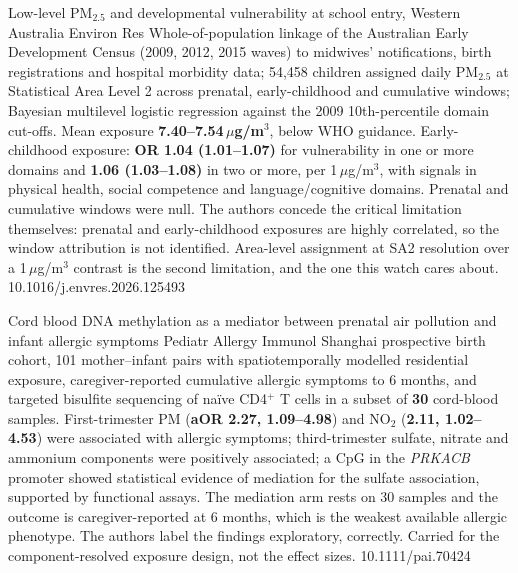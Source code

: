 \documentclass[10pt]{article}
\begin{document}
{Low-level PM$_{2.5}$ and developmental vulnerability at school entry, Western Australia}
{Environ Res}
{Whole-of-population linkage of the Australian Early Development Census (2009, 2012, 2015
waves) to midwives' notifications, birth registrations and hospital morbidity data;
54{,}458 children assigned daily PM$_{2.5}$ at Statistical Area Level 2 across prenatal,
early-childhood and cumulative windows; Bayesian multilevel logistic regression against
the 2009 10th-percentile domain cut-offs. Mean exposure \textbf{7.40--7.54\,$\mu$g/m$^3$},
below WHO guidance. Early-childhood exposure: \textbf{OR 1.04 (1.01--1.07)} for
vulnerability in one or more domains and \textbf{1.06 (1.03--1.08)} in two or more, per
1\,$\mu$g/m$^3$, with signals in physical health, social competence and language/cognitive
domains. Prenatal and cumulative windows were null. The authors concede the critical
limitation themselves: prenatal and early-childhood exposures are highly correlated, so
the window attribution is not identified. Area-level assignment at SA2 resolution over a
1\,$\mu$g/m$^3$ contrast is the second limitation, and the one this watch cares about.}
{10.1016/j.envres.2026.125493}

{Cord blood DNA methylation as a mediator between prenatal air pollution and infant allergic symptoms}
{Pediatr Allergy Immunol}
{Shanghai prospective birth cohort, 101 mother--infant pairs with spatiotemporally
modelled residential exposure, caregiver-reported cumulative allergic symptoms to
6 months, and targeted bisulfite sequencing of na\"ive CD4$^+$ T cells in a subset of
\textbf{30} cord-blood samples. First-trimester PM (\textbf{aOR 2.27, 1.09--4.98}) and
NO$_2$ (\textbf{2.11, 1.02--4.53}) were associated with allergic symptoms; third-trimester
sulfate, nitrate and ammonium components were positively associated; a CpG in the
\textit{PRKACB} promoter showed statistical evidence of mediation for the sulfate
association, supported by functional assays. The mediation arm rests on 30 samples and
the outcome is caregiver-reported at 6 months, which is the weakest available allergic
phenotype. The authors label the findings exploratory, correctly. Carried for the
component-resolved exposure design, not the effect sizes.}
{10.1111/pai.70424}

\end{document}
